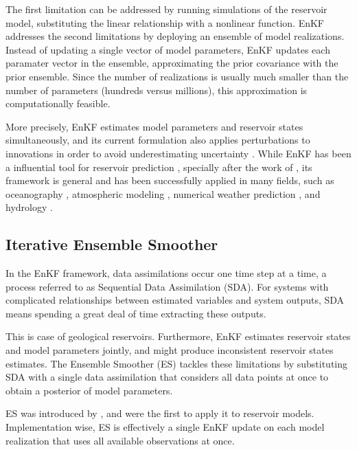 The first limitation can be addressed by running simulations of the reservoir model, 
substituting the linear relationship with a nonlinear function.
EnKF addresses the second limitations by deploying an ensemble of model realizations. 
%
Instead of updating a single vector of model parameters, 
EnKF updates each paramater vector in the ensemble, approximating the prior covariance with the prior ensemble. 
%
Since the number of realizations is usually much smaller than the number of parameters (hundreds versus millions),
this approximation is computationally feasible.

More precisely, EnKF estimates model parameters and reservoir states simultaneously, 
and its current formulation also applies perturbations to innovations in order to avoid underestimating uncertainty 
\cite{Burgers:1998,Houtekamer:1998}.
%
While EnKF has been a influential tool for reservoir prediction \cite{Aanonsen:2009, Oliver:2011}, 
specially after the work of ,
its framework is general and has been successfully applied in many fields, such as
oceanography \cite{Bertino:2003, Keppenne:2003}, 
atmospheric modeling \cite{Whitaker:2008,Houtekamer:2016},
numerical weather prediction \cite{Houtekamer:2005:Monthly,Houtekamer:2005:Quaterly,Szunyogh:2005,Otsuka:2016}, 
and hydrology \cite{Reichle:2002, Chen:2006, Liu:2008, Sun:2016}.

\subsection{Iterative Ensemble Smoother}

In the EnKF framework, data assimilations occur one time step at a time,
a process referred to as Sequential Data Assimilation (SDA).
%
For systems with complicated relationships between estimated variables and system outputs,
SDA means spending a great deal of time extracting these outputs.

This is case of geological reservoirs.
Furthermore, EnKF estimates reservoir states and model parameters jointly,
and might produce inconsistent reservoir states estimates.
% 
The Ensemble Smoother (ES) tackles these limitations by substituting SDA 
with a single data assimilation that considers all data points at once to obtain a posterior of model parameters.

ES was introduced by , 
and  were the first to apply it to reservoir models.
Implementation wise, ES is effectively a single EnKF update on each model realization 
that uses all available observations at once.

